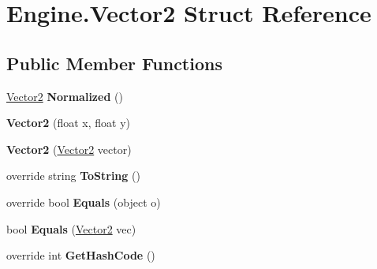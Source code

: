 \hypertarget{struct_engine_1_1_vector2}{\section{Engine.\-Vector2 Struct Reference}
\label{struct_engine_1_1_vector2}
}
\subsection*{Public Member Functions}
\begin{DoxyCompactItemize}
\item 
\hypertarget{struct_engine_1_1_vector2_aff3f4ebd09ded0c8791da3c410131f18}{\hyperlink{struct_engine_1_1_vector2}{Vector2} {\bfseries Normalized} ()}\label{struct_engine_1_1_vector2_aff3f4ebd09ded0c8791da3c410131f18}

\item 
\hypertarget{struct_engine_1_1_vector2_a527cd67280b6f645bffb0096af3235df}{{\bfseries Vector2} (float x, float y)}\label{struct_engine_1_1_vector2_a527cd67280b6f645bffb0096af3235df}

\item 
\hypertarget{struct_engine_1_1_vector2_a4b95f3985f0feaaccaea54d15c9c73b3}{{\bfseries Vector2} (\hyperlink{struct_engine_1_1_vector2}{Vector2} vector)}\label{struct_engine_1_1_vector2_a4b95f3985f0feaaccaea54d15c9c73b3}

\item 
\hypertarget{struct_engine_1_1_vector2_a5086364a2432a354e5147bb4d578fe19}{override string {\bfseries To\-String} ()}\label{struct_engine_1_1_vector2_a5086364a2432a354e5147bb4d578fe19}

\item 
\hypertarget{struct_engine_1_1_vector2_a433720c9119f8313449024aad275a626}{override bool {\bfseries Equals} (object o)}\label{struct_engine_1_1_vector2_a433720c9119f8313449024aad275a626}

\item 
\hypertarget{struct_engine_1_1_vector2_a5e3821a9961f8641efd7810204a1103c}{bool {\bfseries Equals} (\hyperlink{struct_engine_1_1_vector2}{Vector2} vec)}\label{struct_engine_1_1_vector2_a5e3821a9961f8641efd7810204a1103c}

\item 
\hypertarget{struct_engine_1_1_vector2_a68fe9a7fcb0ae624a680ff3d824401ab}{override int {\bfseries Get\-Hash\-Code} ()}\label{struct_engine_1_1_vector2_a68fe9a7fcb0ae624a680ff3d824401ab}


\end{DoxyCompactItemize}
